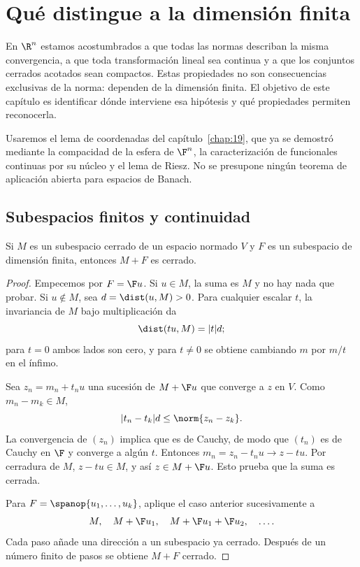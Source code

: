 \chapter{Qué distingue a la dimensión finita}\label{chap:22}

En $\R^n$ estamos acostumbrados a que todas las normas describan la misma convergencia, a que toda transformación lineal sea continua y a que los conjuntos cerrados acotados sean compactos. Estas propiedades no son consecuencias exclusivas de la norma: dependen de la dimensión finita. El objetivo de este capítulo es identificar dónde interviene esa hipótesis y qué propiedades permiten reconocerla.

Usaremos el lema de coordenadas del capítulo~\ref{chap:19}, que ya se demostró mediante la compacidad de la esfera de $\F^n$, la caracterización de funcionales continuas por su núcleo y el lema de Riesz. No se presupone ningún teorema de aplicación abierta para espacios de Banach.

\section{Subespacios finitos y continuidad}

\begin{proposicion}\label{ch22:suma-cerrada}
Si $M$ es un subespacio cerrado de un espacio normado $V$ y $F$ es un subespacio de dimensión finita, entonces $M+F$ es cerrado.
\end{proposicion}
\begin{proof}
Empecemos por $F=\F u$. Si $u\in M$, la suma es $M$ y no hay nada que probar. Si $u\notin M$, sea $d=\dist(u,M)>0$. Para cualquier escalar $t$, la invariancia de $M$ bajo multiplicación da
\[
 \dist(tu,M)=|t|d;
\]
para $t=0$ ambos lados son cero, y para $t\ne0$ se obtiene cambiando $m$ por $m/t$ en el ínfimo.

Sea $z_n=m_n+t_nu$ una sucesión de $M+\F u$ que converge a $z$ en $V$. Como $m_n-m_k\in M$,
\[
 |t_n-t_k|d\leq\norm{z_n-z_k}.
\]
La convergencia de $(z_n)$ implica que es de Cauchy, de modo que $(t_n)$ es de Cauchy en $\F$ y converge a algún $t$. Entonces $m_n=z_n-t_nu\to z-tu$. Por cerradura de $M$, $z-tu\in M$, y así $z\in M+\F u$. Esto prueba que la suma es cerrada.

Para $F=\spanop\{u_1,\ldots,u_k\}$, aplique el caso anterior sucesivamente a
\[
 M,\quad M+\F u_1,\quad M+\F u_1+\F u_2,\quad\ldots.
\]
Cada paso añade una dirección a un subespacio ya cerrado. Después de un número finito de pasos se obtiene $M+F$ cerrado.
\end{proof}

